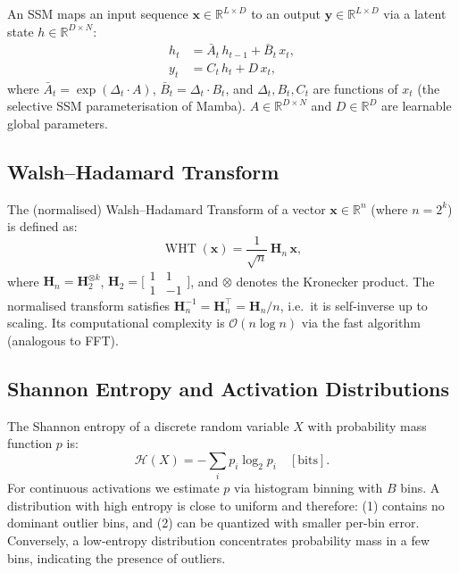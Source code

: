 \documentclass{article}
\newcommand{\mH}{\mathbf{H}}          %
\newcommand{\vx}{\mathbf{x}}          %
\newcommand{\vy}{\mathbf{y}}          %
\newcommand{\cH}{\mathcal{H}}         %
\newcommand{\RR}{\mathbb{R}}
\newcommand{\had}{\mathop{\mathrm{WHT}}\nolimits}  %
\begin{document}
An SSM maps an input sequence $\vx \in \RR^{L \times D}$ to an output
$\vy \in \RR^{L \times D}$ via a latent state $h \in \RR^{D \times N}$:
\begin{align}
  h_t &= \bar{A}_t \, h_{t-1} + \bar{B}_t \, x_t, \label{eq:ssm-state} \\
  y_t &= C_t \, h_t + D \, x_t, \label{eq:ssm-output}
\end{align}
where $\bar{A}_t = \exp(\Delta_t \cdot A)$,
$\bar{B}_t = \Delta_t \cdot B_t$,
and $\Delta_t, B_t, C_t$ are functions of $x_t$ (the selective SSM
parameterisation of Mamba).  $A \in \RR^{D \times N}$ and $D \in \RR^D$ are
learnable global parameters.

\subsection{Walsh–Hadamard Transform}
\label{sec:background:wht}

The (normalised) Walsh–Hadamard Transform of a vector $\vx \in \RR^n$
(where $n = 2^k$) is defined as:
\begin{equation}
  \had(\vx) = \frac{1}{\sqrt{n}} \, \mH_n \, \vx,
  \label{eq:wht}
\end{equation}
where $\mH_n = \mH_2^{\otimes k}$, $\mH_2 = \bigl[\begin{smallmatrix}1&1\\1&-1\end{smallmatrix}\bigr]$,
and $\otimes$ denotes the Kronecker product.  The normalised transform
satisfies $\mH_n^{-1} = \mH_n^\top = \mH_n / n$, i.e.\ it is self-inverse up
to scaling.  Its computational complexity is $\mathcal{O}(n \log n)$ via the
fast algorithm (analogous to FFT).

\subsection{Shannon Entropy and Activation Distributions}
\label{sec:background:entropy}

The Shannon entropy of a discrete random variable $X$ with probability mass
function $p$ is:
\begin{equation}
  \cH(X) = -\sum_i p_i \log_2 p_i \quad [\text{bits}].
  \label{eq:entropy}
\end{equation}
For continuous activations we estimate $p$ via histogram binning with $B$
bins.  A distribution with high entropy is close to uniform and therefore:
(1) contains no dominant outlier bins, and (2) can be quantized with smaller
per-bin error.  Conversely, a low-entropy distribution concentrates probability
mass in a few bins, indicating the presence of outliers.
\end{document}
